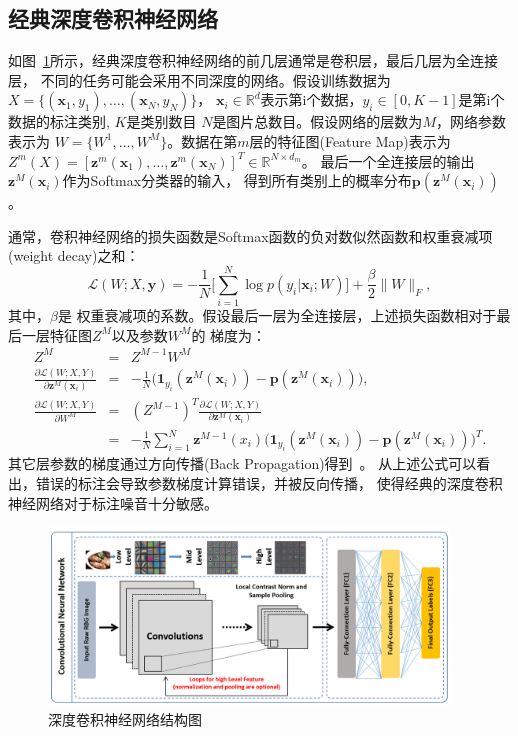 \documentclass[doctor]{ustcthesis}
\def \p {\mathbf{p}}
\def \x {\mathbf{x}}
\def \y {\mathbf{y}}
\def \z {\mathbf{z}}
\def \one {\mathbf{1}}
\def \R {\mathbb{R}}
\def \L {\mathcal{L}}
\begin{document}
\subsection{经典深度卷积神经网络}
如图~\ref{fig:cnn}所示，经典深度卷积神经网络的前几层通常是卷积层，最后几层为全连接层，
不同的任务可能会采用不同深度的网络。假设训练数据为$X=\{(\x_1, y_1), \ldots,
(\x_N, y_N)\}$， $\x_i \in \R^d$表示第i个数据，$y_i \in [0,K-1]$是第i个数据的标注类别,
$K$是类别数目 $N$是图片总数目。假设网络的层数为$M$，网络参数表示为
$W = \{W^1, \ldots, W^M\}$。数据在第$m$层的特征图(Feature Map)表示为
$Z^m(X) = [\z^m(\x_1), \ldots, \z^m(\x_N)]^T \in \R^{N \times d_m}$。
最后一个全连接层的输出$\z^M(\x_i)$作为Softmax分类器的输入，
得到所有类别上的概率分布$\p(\z^M(\x_i))$。

通常，卷积神经网络的损失函数是Softmax函数的负对数似然函数和权重衰减项(weight decay)之和：
\begin{equation}\label{eqn:cnn-loss}
    \L(W;X,\y) = -\frac{1}{N}\Big[\sum_{i=1}^N {\log p(y_i | \x_i; W)}\Big] + \frac{\beta}{2}\|W\|_F,
\end{equation}
其中，$\beta$是
权重衰减项的系数。假设最后一层为全连接层，上述损失函数相对于最后一层特征图$Z^M$以及参数$W^M$的
梯度为：
\begin{eqnarray}
    Z^M &=& Z^{M-1}W^M \\
    \frac{\partial{\L(W;X,Y)}}{\partial{\z^M(\x_i)}} &=&
    -\frac{1}{N} \Big({\one_{y_i}(\z^M(\x_i)) - \p(\z^M(\x_i))}\Big),\\
    \frac{\partial{\L(W;X,Y)}}{\partial{W^M}} &=&
    (Z^{M-1})^T\frac{\partial{\L(W;X,Y)}}{\partial{\z^M(\x_i)}} \nonumber \\
    &=& -\frac{1}{N}\sum_{i=1}^N {\z^{M-1}(x_i) \Big({\one_{y_i}(\z^M(\x_i))
    - \p(\z^M(\x_i))}\Big)^T}.
\end{eqnarray}
其它层参数的梯度通过方向传播(Back Propagation)得到~\cite{lecun1998gradient}。
从上述公式可以看出，错误的标注会导致参数梯度计算错误，并被反向传播，
使得经典的深度卷积神经网络对于标注噪音十分敏感。

\begin{figure}[t]
    \centering
    \includegraphics[clip=true, width=0.95\textwidth]{cnn.png}
    \caption{深度卷积神经网络结构图}
    \label{fig:cnn}
\end{figure}
\end{document}
